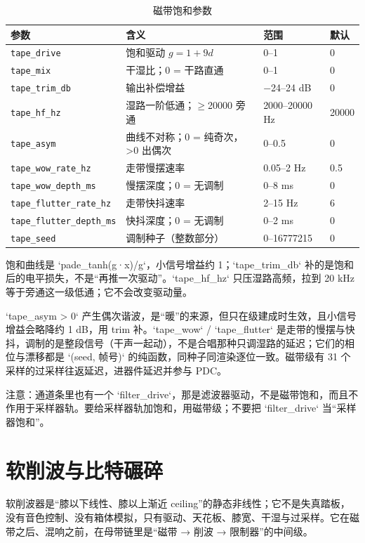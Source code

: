 \begin{table}[htbp]
\centering
\small
\begin{tabular}{@{}llll@{}}
\hline
参数 & 含义 & 范围 & 默认 \\
\hline
\texttt{tape\_drive} & 饱和驱动 $g=1+9d$ & 0–1 & 0 \\
\texttt{tape\_mix} & 干湿比；0 = 干路直通 & 0–1 & 0 \\
\texttt{tape\_trim\_db} & 输出补偿增益 & −24–24 dB & 0 \\
\texttt{tape\_hf\_hz} & 湿路一阶低通；$\geq$20000 旁通 & 2000–20000 Hz & 20000 \\
\texttt{tape\_asym} & 曲线不对称；0 = 纯奇次，>0 出偶次 & 0–0.5 & 0 \\
\texttt{tape\_wow\_rate\_hz} & 走带慢摆速率 & 0.05–2 Hz & 0.5 \\
\texttt{tape\_wow\_depth\_ms} & 慢摆深度；0 = 无调制 & 0–8 ms & 0 \\
\texttt{tape\_flutter\_rate\_hz} & 走带快抖速率 & 2–15 Hz & 6 \\
\texttt{tape\_flutter\_depth\_ms} & 快抖深度；0 = 无调制 & 0–2 ms & 0 \\
\texttt{tape\_seed} & 调制种子（整数部分） & 0–16777215 & 0 \\
\hline
\end{tabular}
\caption{磁带饱和参数}
\label{tab:tape-params}
\end{table}

饱和曲线是 `pade_tanh(g·x)/g`，小信号增益约 1；`tape_trim_db` 补的是饱和后的电平损失，不是“再推一次驱动”。`tape_hf_hz` 只压湿路高频，拉到 20 kHz 等于旁通这一级低通；它不会改变驱动量。

`tape_asym > 0` 产生偶次谐波，是“暖”的来源，但只在级建成时生效，且小信号增益会略降约 1 dB，用 trim 补。`tape_wow` / `tape_flutter` 是走带的慢摆与快抖，调制的是整段信号（干声一起动），不是合唱那种只调湿路的延迟；它们的相位与漂移都是 `(seed, 帧号)` 的纯函数，同种子同渲染逐位一致。磁带级有 31 个采样的过采样往返延迟，进器件延迟并参与 PDC。

注意：通道条里也有一个 `filter_drive`，那是滤波器驱动，不是磁带饱和，而且不作用于采样器轨。要给采样器轨加饱和，用磁带级；不要把 `filter_drive` 当“采样器饱和”。

\section{软削波与比特碾碎}

软削波器是“膝以下线性、膝以上渐近 ceiling”的静态非线性；它不是失真踏板，没有音色控制、没有箱体模拟，只有驱动、天花板、膝宽、干湿与过采样。它在磁带之后、混响之前，在母带链里是“磁带 → 削波 → 限制器”的中间级。

